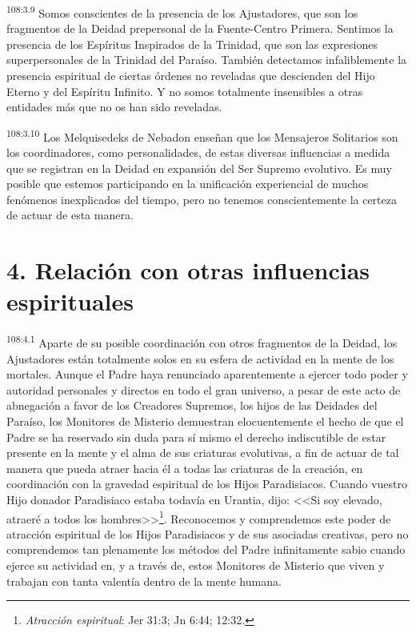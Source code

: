 \documentclass[twoside, 11pt]{book}
\begin{document}
\par
\textsuperscript{108:3.9} Somos conscientes de la presencia de los Ajustadores, que son los fragmentos de la Deidad prepersonal de la Fuente-Centro Primera. Sentimos la presencia de los Espíritus Inspirados de la Trinidad, que son las expresiones superpersonales de la Trinidad del Paraíso. También detectamos infaliblemente la presencia espiritual de ciertas órdenes no reveladas que descienden del Hijo Eterno y del Espíritu Infinito. Y no somos totalmente insensibles a otras entidades más que no os han sido reveladas.

\par
\textsuperscript{108:3.10} Los Melquisedeks de Nebadon enseñan que los Mensajeros Solitarios son los coordinadores, como personalidades, de estas diversas influencias a medida que se registran en la Deidad en expansión del Ser Supremo evolutivo. Es muy posible que estemos participando en la unificación experiencial de muchos fenómenos inexplicados del tiempo, pero no tenemos conscientemente la certeza de actuar de esta manera.

\section*{4. Relación con otras influencias espirituales}
\par
\textsuperscript{108:4.1} Aparte de su posible coordinación con otros fragmentos de la Deidad, los Ajustadores están totalmente solos en su esfera de actividad en la mente de los mortales. Aunque el Padre haya renunciado aparentemente a ejercer todo poder y autoridad personales y directos en todo el gran universo, a pesar de este acto de abnegación a favor de los Creadores Supremos, los hijos de las Deidades del Paraíso, los Monitores de Misterio demuestran elocuentemente el hecho de que el Padre se ha reservado sin duda para sí mismo el derecho indiscutible de estar presente en la mente y el alma de sus criaturas evolutivas, a fin de actuar de tal manera que pueda atraer hacia él a todas las criaturas de la creación, en coordinación con la gravedad espiritual de los Hijos Paradisiacos. Cuando vuestro Hijo donador Paradisiaco estaba todavía en Urantia, dijo: <<Si soy elevado, atraeré a todos los hombres>>\footnote{\textit{Atracción espiritual}: Jer 31:3; Jn 6:44; 12:32.}. Reconocemos y comprendemos este poder de atracción espiritual de los Hijos Paradisiacos y de sus asociadas creativas, pero no comprendemos tan plenamente los métodos del Padre infinitamente sabio cuando ejerce su actividad en, y a través de, estos Monitores de Misterio que viven y trabajan con tanta valentía dentro de la mente humana.
\end{document}
